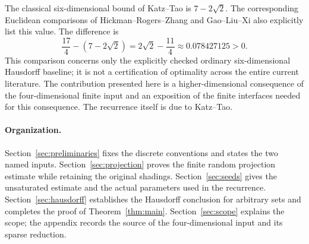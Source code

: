 The classical six-dimensional bound of Katz--Tao\cite{KT} is $7-2\sqrt2$.
The corresponding Euclidean comparisons of Hickman--Rogers--Zhang\cite[Figure 5]{HRZ}
and Gao--Liu--Xi\cite[Table 1]{GLX} also explicitly list this value.
The difference is
\begin{equation}\label{eq:comparison}
 \frac{17}{4}-(7-2\sqrt2)
   =2\sqrt2-\frac{11}{4}
   \approx0.078427125>0.
\end{equation}
This comparison concerns only the explicitly checked ordinary six-dimensional Hausdorff baseline;
it is not a certification of optimality across the entire current literature.
The contribution presented here is a higher-dimensional consequence of the four-dimensional finite input
and an exposition of the finite interfaces needed for this consequence. The recurrence itself is due to Katz--Tao.

\paragraph{Organization.}
Section~\ref{sec:preliminaries} fixes the discrete conventions and states the two named inputs.
Section~\ref{sec:projection} proves the finite random projection estimate while retaining the original shadings.
Section~\ref{sec:seeds} gives the unsaturated estimate and the actual parameters used in the recurrence.
Section~\ref{sec:hausdorff} establishes the Hausdorff conclusion for arbitrary sets and completes the proof of Theorem~\ref{thm:main}.
Section~\ref{sec:scope} explains the scope; the appendix records the source of the four-dimensional input and its sparse reduction.
